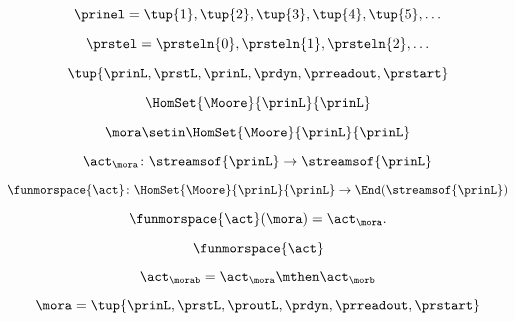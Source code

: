 \begin{forslides}
    \begin{equation}
        \label{eq:slides-processes-14}
        \prinel = \tup{1}, \tup{2}, \tup{3}, \tup{4}, \tup{5}, \ldots
    \end{equation}

    \begin{equation}
        \label{eq:slides-processes-15}
        \prstel = \prsteln{0}, \prsteln{1}, \prsteln{2}, \ldots
    \end{equation}

    \begin{equation}
        \label{eq:slides-processes-16}
        \tup{\prinL,\prstL,\prinL,\prdyn,\prreadout,\prstart}
    \end{equation}

    \begin{equation}
        \label{eq:slides-processes-17}
        \HomSet{\Moore}{\prinL}{\prinL}
    \end{equation}

    \begin{equation}
        \label{eq:slides-processes-18}
        \mora \setin \HomSet{\Moore}{\prinL}{\prinL}
    \end{equation}

    \begin{equation}
        \label{eq:slides-processes-19}
        \act_{\mora} \colon \streamsof{\prinL} \to \streamsof{\prinL}
    \end{equation}

    \begin{equation}
        \label{eq:slides-processes-20}
        \funmorspace{\act} \colon  \HomSet{\Moore}{\prinL}{\prinL} \to \End (\streamsof{\prinL})
    \end{equation}

    \begin{equation}
        \label{eq:slides-processes-21}
        \funmorspace{\act}(\mora) = \act_{\mora}.
    \end{equation}

    \begin{equation}
        \label{eq:slides-processes-22}
        \funmorspace{\act}
    \end{equation}

    \begin{equation}
        \label{eq:slides-processes-23}
        \act_{\morab} = \act_\mora \mthen \act_\morb
    \end{equation}

    \begin{equation}
        \label{eq:slides-processes-24}
        \mora = \tup{\prinL,\prstL,\proutL,\prdyn,\prreadout,\prstart}
    \end{equation}


\end{forslides}
